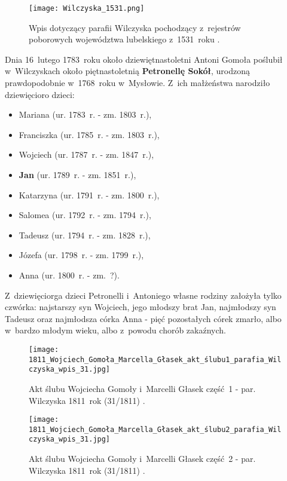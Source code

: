 \begin{figure}[!ht]
    \vspace*{0.5cm}
    \centering \texttt{[image: Wilczyska\_1531.png]}
    \captionsetup{format=hang}
    \caption{Wpis dotyczący parafii Wilczyska pochodzący z~rejestrów 
    poborowych województwa lubelskiego z~1531~roku \cite{apawinski}.}
    \label{fig:wilczyska_1531}
\end{figure}

Dnia 16~lutego 1783~roku około dziewiętnastoletni Antoni Gomoła poślubił 
w~Wilczyskach około piętnastoletnią \textbf{Petronellę Sokół}, urodzoną 
prawdopodobnie w~1768~roku w~Mysłowie. Z~ich małżeństwa narodziło 
dziewięcioro dzieci: 

\begin{itemize}
  \item Mariana (ur. 1783~r. - zm. 1803~r.),
  \item Franciszka (ur. 1785~r. - zm. 1803~r.),
  \item Wojciech (ur. 1787~r. - zm. 1847~r.),
  \item \textbf{Jan} (ur. 1789~r. - zm. 1851~r.),
  \item Katarzyna (ur. 1791~r. - zm. 1800~r.),
  \item Salomea (ur. 1792~r. - zm. 1794~r.),
  \item Tadeusz (ur. 1794~r. - zm. 1828~r.),
  \item Józefa (ur. 1798~r. - zm. 1799~r.),
  \item Anna (ur. 1800~r. - zm.~?).
\end{itemize}

Z~dziewięciorga dzieci Petronelli i~Antoniego własne rodziny założyła tylko 
czwórka: najstarszy syn Wojciech, jego młodszy brat Jan, najmłodszy syn 
Tadeusz oraz najmłodsza córka Anna - pięć pozostałych córek zmarło, albo 
w~bardzo młodym wieku, albo z~powodu chorób zakaźnych.

\begin{figure}[!ht]
    \vspace*{0.5cm}
    \centering \texttt{[image: 
        1811\_Wojciech\_Gomoła\_Marcella\_Głasek\_akt\_ślubu1\_parafia\_Wilczyska\_wpis\_31.jpg]}
    \captionsetup{format=hang}
    \caption{Akt ślubu Wojciecha Gomoły i~Marcelli Głasek część~1 - par. 
    Wilczyska 1811~rok (31/1811) \cite{par_wilczyska1}.}
    \label{fig:wmgomola_slub1}
\end{figure}

\begin{figure}[!ht]
    \vspace*{0.5cm}
    \centering \texttt{[image: 
        1811\_Wojciech\_Gomoła\_Marcella\_Głasek\_akt\_ślubu2\_parafia\_Wilczyska\_wpis\_31.jpg]}
    \captionsetup{format=hang}
    \caption{Akt ślubu Wojciecha Gomoły i~Marcelli Głasek część~2 - par. 
    Wilczyska 1811~rok (31/1811) \cite{par_wilczyska1}.}
    \label{fig:wmgomola_slub2}
\end{figure}


